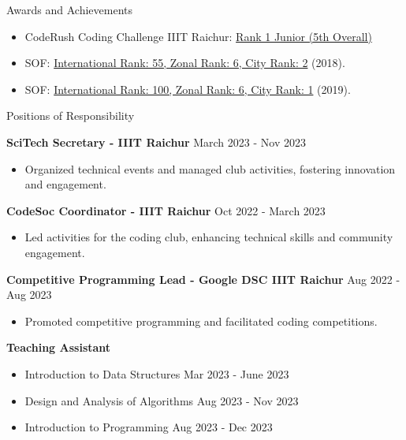 \documentclass{resume} %
\begin{document}
\begin{rSection}{Awards and Achievements}

    \begin{itemize}
        \itemsep -3pt {}
        \item CodeRush Coding Challenge IIIT Raichur: \href{https://drive.google.com/file/d/1BdOPAlKCXyNEZf-ujJ5Iu8lBBra77hJg/view?usp=sharing}{Rank 1 Junior (5th Overall)}
        \item SOF: \href{https://drive.google.com/file/d/1b_JE3MbNI2eW9xpYvC1NWCfUGChuEVBy/view?usp=sharing}{International Rank: 55, Zonal Rank: 6, City Rank: 2} (2018).
        \item SOF: \href{https://drive.google.com/file/d/1bnRRCB6FZKDpJm0-Ogz15o56iG2QN_1t/view?usp=sharing}{International Rank: 100, Zonal Rank: 6, City Rank: 1} (2019).
    \end{itemize}

\end{rSection}


\begin{rSection}{Positions of Responsibility}

    \textbf{SciTech Secretary - IIIT Raichur} \hfill March 2023 - Nov 2023
    \begin{itemize}
        \itemsep -3pt {}
        \item Organized technical events and managed club activities, fostering innovation and engagement.
    \end{itemize}

    \textbf{CodeSoc Coordinator - IIIT Raichur} \hfill Oct 2022 - March 2023
    \begin{itemize}
        \itemsep -3pt {}
        \item Led activities for the coding club, enhancing technical skills and community engagement.
    \end{itemize}

    \textbf{Competitive Programming Lead - Google DSC IIIT Raichur} \hfill Aug 2022 - Aug 2023
    \begin{itemize}
        \itemsep -3pt {}
        \item Promoted competitive programming and facilitated coding competitions.
    \end{itemize}

    \textbf{Teaching Assistant}
    \begin{itemize}
        \itemsep -3pt {}
        \item Introduction to Data Structures \hfill Mar 2023 - June 2023
        \item Design and Analysis of Algorithms \hfill Aug 2023 - Nov 2023
        \item Introduction to Programming \hfill Aug 2023 - Dec 2023
    \end{itemize}

\end{rSection}
\end{document}
